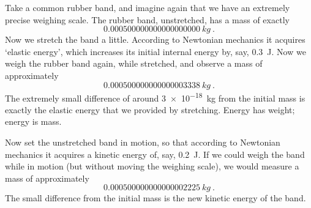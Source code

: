 \documentclass[a4paper,12pt,%
onecolumn,oneside,titlepage,%
british%
]{memoir}
\renewcommand*{\|}[1][]{\nonscript\:#1\vert\nonscript\:\mathopen{}}
\begin{document}
Take a common rubber band, and imagine again that we have an extremely precise weighing scale. The rubber band, unstretched, has a mass of exactly
\begin{equation*}
  \qty{0.000500000000000000000}{kg}\ .
\end{equation*}
Now we stretch the band a little. According to Newtonian mechanics it acquires \enquote*{elastic energy}, which increases its initial internal energy by, say, \qty{0.3}{J}.
Now we weigh the rubber band again, while stretched, and observe a mass of approximately
\begin{equation*}
  \qty{0.000500000000000003338}{kg} \ .
\end{equation*}
The extremely small difference of around \qty{3e-18}{kg} from the initial mass
is exactly the elastic energy that we provided by stretching.
Energy has weight; energy is mass.

Now set the unstretched band in motion, so that according to Newtonian mechanics it acquires a kinetic energy of, say, \qty{0.2}{J}. If we could weigh the band while in motion (but without moving the weighing scale), we would measure a mass of approximately
$$\qty{0.000500000000000002225}{kg} \ .$$
The small difference from the initial mass is the new kinetic energy of the band.
\end{document}
